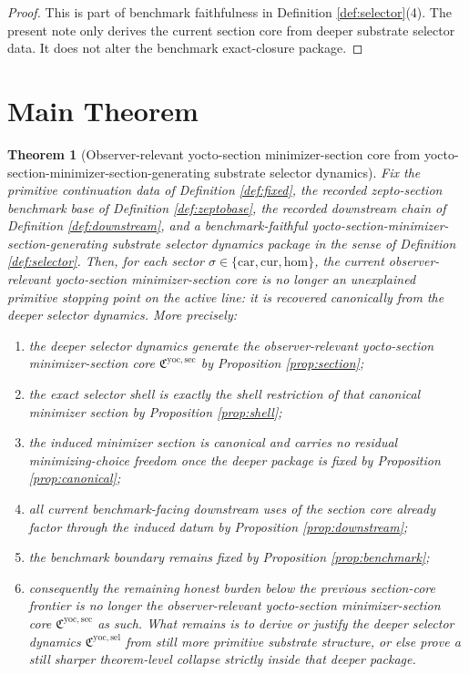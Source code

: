 \documentclass[11pt]{article}
\newcommand{\Car}{\mathrm{car}}
\newcommand{\Cur}{\mathrm{cur}}
\newcommand{\Hom}{\mathrm{hom}}
\newcommand{\YoctoMinSectionCore}{\mathfrak C^{\mathrm{yoc,sec}}}
\newcommand{\YoctoSelectorPackage}{\mathfrak C^{\mathrm{yoc,sel}}}
\newtheorem{theorem}{Theorem}
\begin{document}
\begin{proof}
This is part of benchmark faithfulness in Definition \ref{def:selector}(4). The present note only derives the current section core from deeper substrate selector data. It does not alter the benchmark exact-closure package.
\end{proof}

\section{Main Theorem}

\begin{theorem}[Observer-relevant yocto-section minimizer-section core from yocto-section-minimizer-section-generating substrate selector dynamics]
\label{thm:main}
Fix the primitive continuation data of Definition \ref{def:fixed}, the recorded zepto-section benchmark base of Definition \ref{def:zeptobase}, the recorded downstream chain of Definition \ref{def:downstream}, and a benchmark-faithful yocto-section-minimizer-section-generating substrate selector dynamics package in the sense of Definition \ref{def:selector}. Then, for each sector \(\sigma\in\{\Car,\Cur,\Hom\}\), the current observer-relevant yocto-section minimizer-section core is no longer an unexplained primitive stopping point on the active line: it is recovered canonically from the deeper selector dynamics. More precisely:
\begin{enumerate}
    \item the deeper selector dynamics generate the observer-relevant yocto-section minimizer-section core \(\YoctoMinSectionCore\) by Proposition \ref{prop:section};
    \item the exact selector shell is exactly the shell restriction of that canonical minimizer section by Proposition \ref{prop:shell};
    \item the induced minimizer section is canonical and carries no residual minimizing-choice freedom once the deeper package is fixed by Proposition \ref{prop:canonical};
    \item all current benchmark-facing downstream uses of the section core already factor through the induced datum by Proposition \ref{prop:downstream};
    \item the benchmark boundary remains fixed by Proposition \ref{prop:benchmark};
    \item consequently the remaining honest burden below the previous section-core frontier is no longer the observer-relevant yocto-section minimizer-section core \(\YoctoMinSectionCore\) as such. What remains is to derive or justify the deeper selector dynamics \(\YoctoSelectorPackage\) from still more primitive substrate structure, or else prove a still sharper theorem-level collapse strictly inside that deeper package.
\end{enumerate}
\end{theorem}
\end{document}
